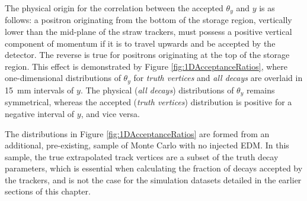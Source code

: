 
The physical origin for the correlation between the accepted $\theta_{y}$ and $y$ is as follows: a positron originating from the bottom of the storage region, vertically lower than the mid-plane of the straw trackers, must possess a positive vertical component of momentum if it is to travel upwards and be accepted by the detector. The reverse is true for positrons originating at the top of the storage region. This effect is demonstrated by Figure \ref{fig:1DAcceptanceRatios}, where one-dimensional distributions of $\theta_{y}$ for \textit{truth vertices} and \textit{all decays} are overlaid in \SI{15}{\milli\metre} intervals of $y$. The physical (\textit{all decays}) distributions of $\theta_{y}$ remains symmetrical, whereas the accepted (\textit{truth vertices}) distribution is positive for a negative interval of $y$, and vice versa. 

The distributions in Figure \ref{fig:1DAcceptanceRatios} are formed from an additional, pre-existing, sample of Monte Carlo with no injected EDM. In this sample, the true extrapolated track vertices are a subset of the truth decay parameters, which is essential when calculating the fraction of decays accepted by the trackers, and is not the case for the simulation datasets detailed in the earlier sections of this chapter. 

